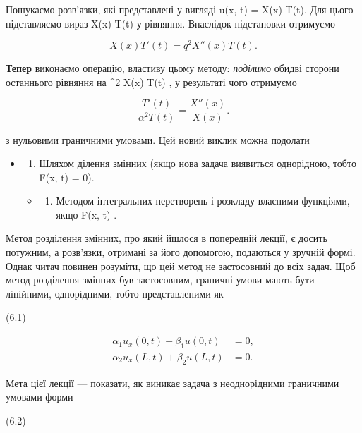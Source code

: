 \documentclass[
  ukrainian,
]{article}
\providecommand{\tightlist}{%
  \setlength{\itemsep}{0pt}\setlength{\parskip}{0pt}}
\begin{document}
Пошукаємо розв'язки, які представлені у вигляді u(x, t) = X(x) T(t). Для
цього підставляємо вираз X(x) T(t) у рівняння. Внаслідок підстановки
отримуємо

\[
X(x) T'(t) = q^2 X''(x) T(t).
\]

\textbf{Тепер} виконаємо операцію, властиву цьому методу:
\emph{поділимо} обидві сторони останнього рівняння на \alpha\^{}2 X(x)
T(t) , у результаті чого отримуємо

\[
\frac{T'(t)}{\alpha^2 T(t)} = \frac{X''(x)}{X(x)}.
\]

з нульовими граничними умовами. Цей новий виклик можна подолати

\begin{itemize}
\item
  \begin{enumerate}
  \def\labelenumi{\arabic{enumi}.}
  \tightlist
  \item
    Шляхом ділення змінних (якщо нова задача виявиться однорідною, тобто
    F(x, t) = 0).
  \end{enumerate}

  \begin{itemize}
  \tightlist
  \item
    \begin{enumerate}
    \def\labelenumi{\arabic{enumi}.}
    \setcounter{enumi}{1}
    \tightlist
    \item
      Методом інтегральних перетворень і розкладу власними функціями,
      якщо F(x, t)  .
    \end{enumerate}
  \end{itemize}
\end{itemize}

Метод розділення змінних, про який йшлося в попередній лекції, є досить
потужним, а розв'язки, отримані за його допомогою, подаються у зручній
формі. Однак читач повинен розуміти, що цей метод не застосовний до всіх
задач. Щоб метод розділення змінних був застосовним, граничні умови
мають бути лінійними, однорідними, тобто представленими як

(6.1)

\[
\begin{aligned} \alpha_1 u_x(0, t) + \beta_1 u(0, t) &= 0, \\ \alpha_2 u_x(L, t) + \beta_2 u(L, t) &= 0. \end{aligned}
\]

Мета цієї лекції --- показати, як виникає задача з неоднорідними
граничними умовами форми

(6.2)
\end{document}

